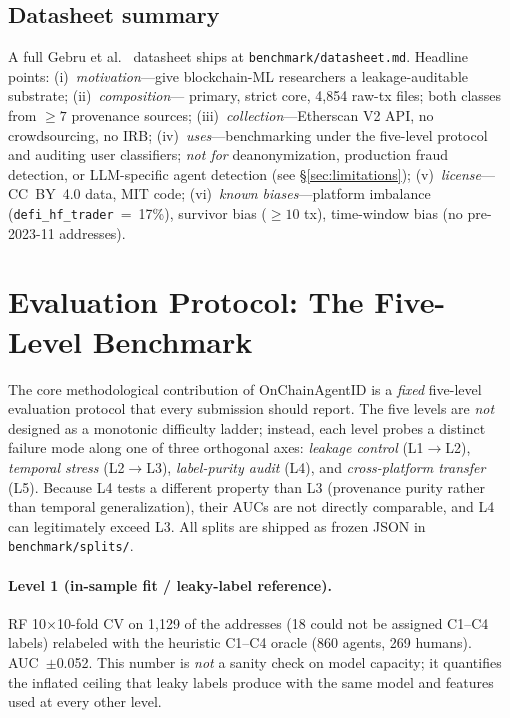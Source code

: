 \documentclass[10pt]{article}
\begin{document}
\subsection{Datasheet summary}

A full Gebru et al.~\cite{gebru2018datasheets} datasheet ships at \texttt{benchmark/datasheet.md}. Headline points: (i)~\emph{motivation}---give blockchain-ML researchers a leakage-auditable substrate; (ii)~\emph{composition}---\datasetNAddresses{} primary, \datasetStrictCoreN{} strict core, 4{,}854 raw-tx files; both classes from $\geq 7$ provenance sources; (iii)~\emph{collection}---Etherscan V2 API, no crowdsourcing, no IRB; (iv)~\emph{uses}---benchmarking under the five-level protocol and auditing user classifiers; \emph{not for} deanonymization, production fraud detection, or LLM-specific agent detection (see \S\ref{sec:limitations}); (v)~\emph{license}---CC~BY~4.0 data, MIT code; (vi)~\emph{known biases}---platform imbalance (\texttt{defi\_hf\_trader}~=~17\%), survivor bias ($\geq 10$ tx), time-window bias (no pre-2023-11 addresses).

\section{Evaluation Protocol: The Five-Level Benchmark}
\label{sec:protocol}

The core methodological contribution of OnChainAgentID is a \emph{fixed} five-level evaluation protocol that every submission should report. The five levels are \emph{not} designed as a monotonic difficulty ladder; instead, each level probes a distinct failure mode along one of three orthogonal axes: \emph{leakage control} (L1$\to$L2), \emph{temporal stress} (L2$\to$L3), \emph{label-purity audit} (L4), and \emph{cross-platform transfer} (L5). Because L4 tests a different property than L3 (provenance purity rather than temporal generalization), their AUCs are not directly comparable, and L4 can legitimately exceed L3. All splits are shipped as frozen JSON in \texttt{benchmark/splits/}.

\paragraph{Level 1 (in-sample fit / leaky-label reference).} RF 10$\times$10-fold CV on 1{,}129 of the \datasetNAddresses{} addresses (18 could not be assigned C1--C4 labels) relabeled with the heuristic C1--C4 oracle (860 agents, 269 humans). AUC~\cascadeLevelLeakyAuc{}$\pm$0.052. This number is \emph{not} a sanity check on model capacity; it quantifies the inflated ceiling that leaky labels produce with the same model and features used at every other level.
\end{document}
